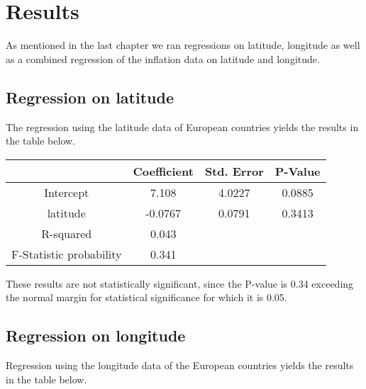 \documentclass{article}
\begin{document}
    \section{Results}
    
    As mentioned in the last chapter we ran regressions on latitude, longitude as well as a combined regression of the inflation data on latitude and longitude. 

    \subsection{Regression on latitude}

    The regression using the latitude data of European countries yields the results in the table below.
   
    \vspace{\baselineskip}

    \begin{center}
    \begin{tabular}{cccc}
        \toprule
        {} &  Coefficient &  Std. Error &   P-Value \\
        \midrule
        Intercept &     7.108 &    4.0227 &  0.0885 \\
        latitude  &    -0.0767 &    0.0791 &  0.3413 \\
        \hline
        R-squared     &     0.043\\
        F-Statistic probability &   0.341\\
        \bottomrule
        
        \end{tabular}
    \end{center}
    \vspace{\baselineskip}

    These results are not statistically significant, since the P-value is 0.34 exceeding the normal margin for statistical significance for which it is 0.05.

    \subsection{Regression on longitude}

    Regression using the longitude data of the European countries yields the results in the table below.

    \vspace{\baselineskip}
\end{document}
